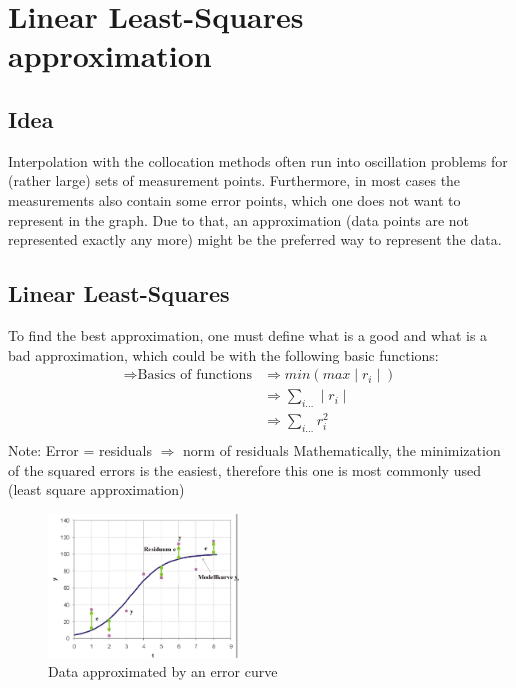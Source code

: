 \section{Linear Least-Squares approximation}
\subsection{Idea}
Interpolation with the collocation methods often run into oscillation problems for (rather large) sets of measurement points. Furthermore, in most cases the measurements also contain some error points, which one does not want to represent in the graph. Due to that, an approximation (data points are not represented exactly any more) might be the preferred way to represent the data. 
\subsection{Linear Least-Squares}
To find the best approximation, one must define what is a good and what is a bad approximation, which could be with the following basic functions:\newline
$$
\begin{aligned}
    \Rightarrow \text{Basics of functions} & \Rightarrow min(max\mid r_i \mid)\\
    & \Rightarrow \sum_{i \dots} \mid r_i \mid\\
    & \Rightarrow \sum_{i \dots}  r_i^2\\
\end{aligned}
$$
Note: Error = residuals $\Rightarrow$ norm of residuals\newline
Mathematically, the minimization of the squared errors is the easiest, therefore this one is most commonly used (least square approximation)
\begin{figure}
  \centering
  \includegraphics[width=0.45\textwidth]{images/Screenshot 2022-10-26 091954.jpg}
  \caption{Data approximated by an error curve}
  \label{fig:overview}
\end{figure}\newline
